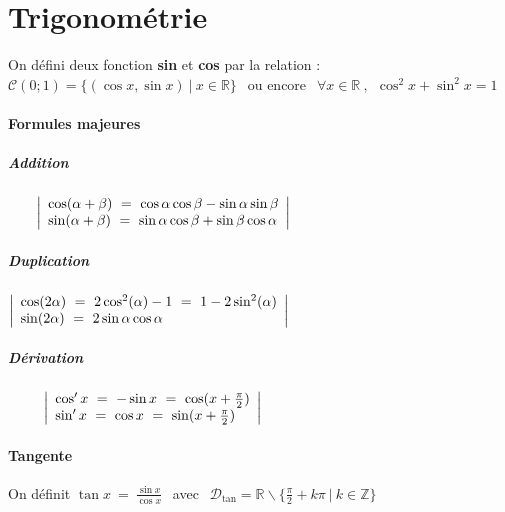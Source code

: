  \section{Trigonométrie}
 
 On défini deux fonction \textbf{sin} et \textbf{cos} par la relation :
\\$\mathcal{C} (0;1) = \{(\cos x , \sin x ) ~\vert ~x\in\mathbb{R}\}~~$ ou encore $~~\forall x\in\mathbb{R} ~,~~ \cos^2 x + \sin^2 x = 1$
 
 \paragraph{Formules majeures}
 
 \subparagraph{Addition}
 $\hspace*{20pt}\left\vert \ar* \cos (\alpha + \beta ) ~=~ \cos\alpha\cos\beta - \sin\alpha\sin\beta \\ \sin (\alpha + \beta ) ~=~ \sin\alpha\cos\beta + \sin\beta\cos\alpha \ar\right\vert$
 
 \subparagraph{Duplication}
 
 $\left\vert \ar* \cos (2\alpha ) ~=~ 2\cos^2 (\alpha ) -1 ~=~ 1-2\sin^2 (\alpha ) \\ \sin (2\alpha ) ~=~ 2\sin\alpha\cos\alpha \ar\right\vert$
 
 \subparagraph{Dérivation}
 
 $ \hspace*{25pt}\left\vert \ar* \cos 'x ~=~ -\sin x ~=~ \cos (x+\frac{\pi}{2} ) \\ \sin 'x ~=~ \cos x ~=~ \sin (x+\frac{\pi}{2} ) \ar \right\vert$
 
 \paragraph{Tangente}
 
 On définit $\tan x ~=~ \frac{\sin x}{\cos x}~~$ avec $~~ \mathcal{D}_{\tan} = \mathbb{R}\backslash \{\frac{\pi}{2} + k\pi ~\vert ~k\in \mathbb{Z} \}$
 
 
